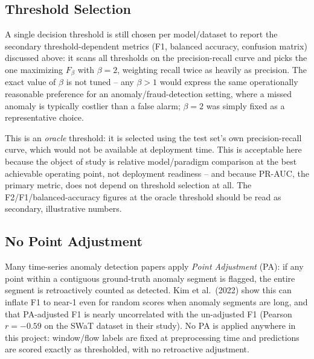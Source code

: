 \subsection{Threshold Selection}

A single decision threshold is still chosen per model/dataset to report the secondary threshold-dependent metrics (F1, balanced accuracy, confusion matrix) discussed above: it scans all thresholds on the precision-recall curve and picks the one maximizing $F_\beta$ with $\beta=2$, weighting recall twice as heavily as precision. The exact value of $\beta$ is not tuned -- any $\beta>1$ would express the same operationally reasonable preference for an anomaly/fraud-detection setting, where a missed anomaly is typically costlier than a false alarm; $\beta=2$ was simply fixed as a representative choice.

This is an \emph{oracle} threshold: it is selected using the test set's own precision-recall curve, which would not be available at deployment time. This is acceptable here because the object of study is relative model/paradigm comparison at the best achievable operating point, not deployment readiness -- and because PR-AUC, the primary metric, does not depend on threshold selection at all. The F2/F1/balanced-accuracy figures at the oracle threshold should be read as secondary, illustrative numbers.

\subsection{No Point Adjustment}

Many time-series anomaly detection papers apply \emph{Point Adjustment} (PA): if any point within a contiguous ground-truth anomaly segment is flagged, the entire segment is retroactively counted as detected. Kim et al.\ (2022) show this can inflate F1 to near-1 even for random scores when anomaly segments are long, and that PA-adjusted F1 is nearly uncorrelated with the un-adjusted F1 (Pearson $r=-0.59$ on the SWaT dataset in their study). No PA is applied anywhere in this project: window/flow labels are fixed at preprocessing time and predictions are scored exactly as thresholded, with no retroactive adjustment.
